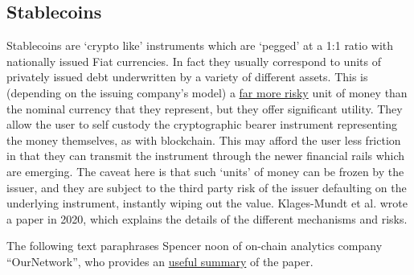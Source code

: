 \subsection{Stablecoins}
Stablecoins are `crypto like' instruments which are `pegged' at a 1:1 ratio with nationally issued Fiat currencies. In fact they usually correspond to units of privately issued  debt underwritten by a variety of different assets. This is (depending on the issuing company's model) a \href{https://www.americanbanker.com/opinion/ststablecoins-are-backed-by-reserves-give-us-a-break}{far more risky} unit of money than the nominal currency that they represent, but they offer significant utility. They allow the user to self custody the cryptographic bearer instrument representing the money themselves, as with blockchain. This may afford the user less friction in that they can transmit the instrument through the newer financial rails which are emerging. The caveat here is that such `units' of money can be frozen by the issuer, and they are subject to the third party risk of the issuer defaulting on the underlying instrument, instantly wiping out the value. Klages-Mundt et al. wrote a paper in 2020, which explains the details of the different mechanisms and risks.\par
The following text paraphrases Spencer noon of on-chain analytics company ``OurNetwork'', who provides an \href{https://twitter.com/spencernoon/status/1524752048121466883}{useful summary} of the paper.
